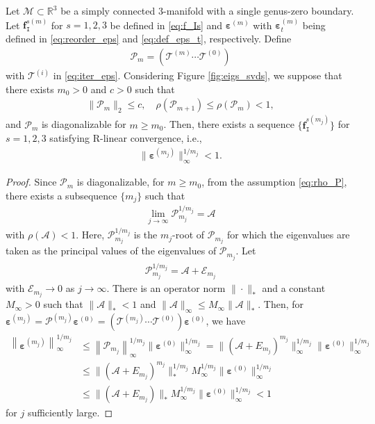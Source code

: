 \documentclass[onefignum,onetabnum]{siamonline220329}
\numberwithin{equation}{section}
\def\beps{{\boldsymbol{\varepsilon}}}
\begin{document}
\begin{sloppypar}
\begin{theorem}
\label{thm3.6}
Let $\mathcal{M}\subset\mathbb{R}^3$ be a simply connected 3-manifold with a single genus-zero boundary. Let $\mathbf{f}_{\mathtt{I}}^{s(m)}$ for $s=1, 2, 3$ be defined in \eqref{eq:f_Is} and $\beps^{(m)}$ with $\beps_t^{(m)}$ being defined in \eqref{eq:reorder_eps} and \eqref{eq:def_eps_t}, respectively. Define
\begin{align}
\mathcal{P}_m = (\mathcal{T}^{(m)} \cdots \mathcal{T}^{(0)}) \label{eq:mtx_Pm}
\end{align}
with $\mathcal{T}^{(i)}$ in \eqref{eq:iter_eps}. Considering Figure \ref{fig:eigs_svds}, we suppose that there exists $m_0 > 0$ and $c > 0$ such that
\begin{align}
\| \mathcal{P}_m \|_2 \leq c, \quad \rho(\mathcal{P}_{m+1}) \leq \rho(\mathcal{P}_m) < 1, \label{eq:rho_P}
\end{align}
and $\mathcal{P}_m$ is diagonalizable for $m \geq m_0$.
Then, there exists a sequence $\{\mathbf{f}_{\mathtt{I}}^{s(m_j)}\}$ for $s=1, 2, 3$ satisfying R-linear convergence, i.e.,
\begin{align*}
\|\beps^{(m_j)} \|_{\infty}^{1/m_j} <1.
\end{align*}
\end{theorem}
\begin{proof}
Since $\mathcal{P}_m$ is diagonalizable, for $m \geq m_0$, from the assumption \eqref{eq:rho_P}, there exists a subsequence $\{m_j\}$ such that
\begin{align*}
\lim_{j \to \infty} \mathcal{P}_{m_j}^{1/m_j} = \mathcal{A}
\end{align*}
with $\rho(\mathcal{A}) < 1$. Here, $\mathcal{P}_{m_j}^{1/m_j}$ is the $m_j$-root of $\mathcal{P}_{m_j}$ for which the eigenvalues are taken as the principal values of the eigenvalues of $\mathcal{P}_{m_j}$.
Let
\begin{align*}
\mathcal{P}_{m_j}^{1/m_j} = \mathcal{A} + \mathcal{E}_{m_j}
\end{align*}
with $\mathcal{E}_{m_j} \to 0$ as $j \to \infty$.
There is an operator norm $\|\cdot\|_{\ast}$ and a constant $M_\infty>0$ such that $\| \mathcal{A} \|_{\ast} < 1$ and $\| \mathcal{A} \|_{\infty} \leq M_{\infty} \| \mathcal{A} \|_{\ast}$. Then, for $\beps^{(m_j)} = \mathcal{P}^{(m_j)} \beps^{(0)} = (\mathcal{T}^{(m_j)} \cdots \mathcal{T}^{(0)}) \beps^{(0)}$, we have
\begin{align*}
\left\|\beps^{(m_j)} \right\|^{1/m_j}_{\infty}
&\leq \left\| \mathcal{P}_{m_j} \right\|^{1/m_j}_{\infty} \| \beps^{(0)} \|^{1/m_j}_{\infty} = \| (\mathcal{A} + E_{m_j})^{m_j} \|^{1/m_j}_{\infty} \| \beps^{(0)} \|^{1/m_j}_{\infty} \\
&\leq \| (\mathcal{A} + E_{m_j})^{m_j} \|^{1/m_j}_{\ast} M_{\infty}^{1/m_j} \| \beps^{(0)} \|^{1/m_j}_{\infty} \\
&\leq \| (\mathcal{A} + E_{m_j})  \|_{\ast} M_{\infty}^{1/m_j} \| \beps^{(0)} \|^{1/m_j}_{\infty} <1
\end{align*}
for $j$ sufficiently large.
\end{proof}


\end{sloppypar}
\end{document}
